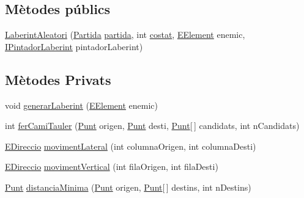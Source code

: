 \subsection*{Mètodes públics}
\begin{DoxyCompactItemize}
\item 
\hyperlink{classlogica_1_1laberints_1_1_laberint_aleatori_aafae50e4b6d51475d8e53d7fee61785b}{Laberint\+Aleatori} (\hyperlink{classlogica_1_1_partida}{Partida} \hyperlink{classlogica_1_1laberints_1_1_laberint_a7183ce070714f73e078bb36e8c21b575}{partida}, int \hyperlink{classlogica_1_1laberints_1_1_laberint_ae874ac4889592b811709f5b967d85286}{costat}, \hyperlink{enumlogica_1_1enumeracions_1_1_e_element}{E\+Element} enemic, \hyperlink{interfaceinterficie_1_1_i_pintador_laberint}{I\+Pintador\+Laberint} pintador\+Laberint)
\end{DoxyCompactItemize}
\subsection*{Mètodes Privats}
\begin{DoxyCompactItemize}
\item 
void \hyperlink{classlogica_1_1laberints_1_1_laberint_aleatori_a8a24d71239fade75e2d70df929d84953}{generar\+Laberint} (\hyperlink{enumlogica_1_1enumeracions_1_1_e_element}{E\+Element} enemic)
\item 
int \hyperlink{classlogica_1_1laberints_1_1_laberint_aleatori_a47db90910ec4b5e0f0b2343944233c28}{fer\+Cami\+Tauler} (\hyperlink{classlogica_1_1_punt}{Punt} origen, \hyperlink{classlogica_1_1_punt}{Punt} desti, \hyperlink{classlogica_1_1_punt}{Punt}\mbox{[}$\,$\mbox{]} candidats, int n\+Candidats)
\item 
\hyperlink{enumlogica_1_1enumeracions_1_1_e_direccio}{E\+Direccio} \hyperlink{classlogica_1_1laberints_1_1_laberint_aleatori_ada4e1006d2705e3cc6c1a243ec1869e4}{moviment\+Lateral} (int columna\+Origen, int columna\+Desti)
\item 
\hyperlink{enumlogica_1_1enumeracions_1_1_e_direccio}{E\+Direccio} \hyperlink{classlogica_1_1laberints_1_1_laberint_aleatori_a3a7a461bad967c5e2870594da8a4c913}{moviment\+Vertical} (int fila\+Origen, int fila\+Desti)
\item 
\hyperlink{classlogica_1_1_punt}{Punt} \hyperlink{classlogica_1_1laberints_1_1_laberint_aleatori_adea89761d3eeba42d9e833ffc707d234}{distancia\+Minima} (\hyperlink{classlogica_1_1_punt}{Punt} origen, \hyperlink{classlogica_1_1_punt}{Punt}\mbox{[}$\,$\mbox{]} destins, int n\+Destins)
\end{DoxyCompactItemize}

